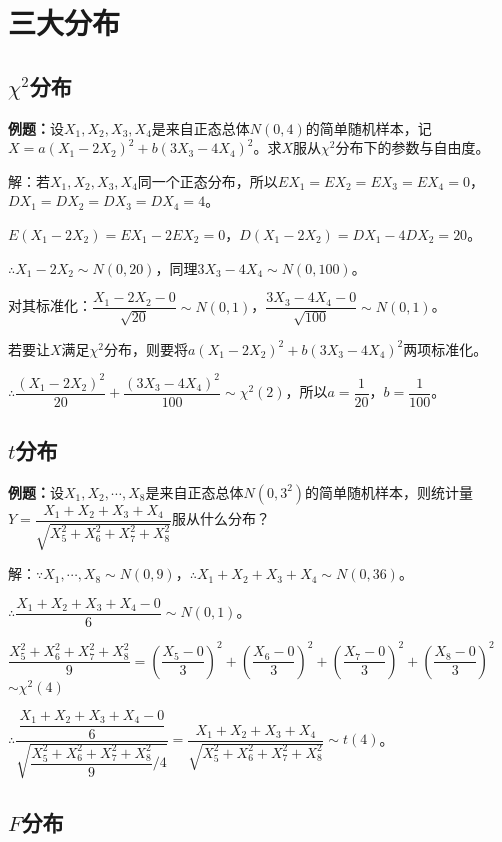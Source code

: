 \documentclass[UTF8, 12pt]{ctexart}
\begin{document}
\section{三大分布}

\subsection{\texorpdfstring{$\chi^2$分布}{}}

\textbf{例题：}设$X_1,X_2,X_3,X_4$是来自正态总体$N(0,4)$的简单随机样本，记$X=a(X_1-2X_2)^2+b(3X_3-4X_4)^2$。求$X$服从$\chi^2$分布下的参数与自由度。

解：若$X_1,X_2,X_3,X_4$同一个正态分布，所以$EX_1=EX_2=EX_3=EX_4=0$，$DX_1=DX_2=DX_3=DX_4=4$。

$E(X_1-2X_2)=EX_1-2EX_2=0$，$D(X_1-2X_2)=DX_1-4DX_2=20$。

$\therefore X_1-2X_2\sim N(0,20)$，同理$3X_3-4X_4\sim N(0,100)$。

对其标准化：$\dfrac{X_1-2X_2-0}{\sqrt{20}}\sim N(0,1)$，$\dfrac{3X_3-4X_4-0}{\sqrt{100}}\sim N(0,1)$。

若要让$X$满足$\chi^2$分布，则要将$a(X_1-2X_2)^2+b(3X_3-4X_4)^2$两项标准化。

$\therefore\dfrac{(X_1-2X_2)^2}{20}+\dfrac{(3X_3-4X_4)^2}{100}\sim\chi^2(2)$，所以$a=\dfrac{1}{20}$，$b=\dfrac{1}{100}$。

\subsection{\texorpdfstring{$t$分布}{}}

\textbf{例题：}设$X_1,X_2,\cdots,X_8$是来自正态总体$N(0,3^2)$的简单随机样本，则统计量$Y=\dfrac{X_1+X_2+X_3+X_4}{\sqrt{X_5^2+X_6^2+X_7^2+X_8^2}}$服从什么分布？

解：$\because X_1,\cdots,X_8\sim N(0,9)$，$\therefore X_1+X_2+X_3+X_4\sim N(0,36)$。

$\therefore\dfrac{X_1+X_2+X_3+X_4-0}{6}\sim N(0,1)$。

$\dfrac{X_5^2+X_6^2+X_7^2+X_8^2}{9}=\left(\dfrac{X_5-0}{3}\right)^2+\left(\dfrac{X_6-0}{3}\right)^2+\left(\dfrac{X_7-0}{3}\right)^2+\left(\dfrac{X_8-0}{3}\right)^2$\\$\sim\chi^2(4)$

$\therefore\dfrac{\dfrac{X_1+X_2+X_3+X_4-0}{6}}{\sqrt{\dfrac{X_5^2+X_6^2+X_7^2+X_8^2}{9}/4}}=\dfrac{X_1+X_2+X_3+X_4}{\sqrt{X_5^2+X_6^2+X_7^2+X_8^2}}\sim t(4)$。

\subsection{\texorpdfstring{$F$分布}{}}
\end{document}
